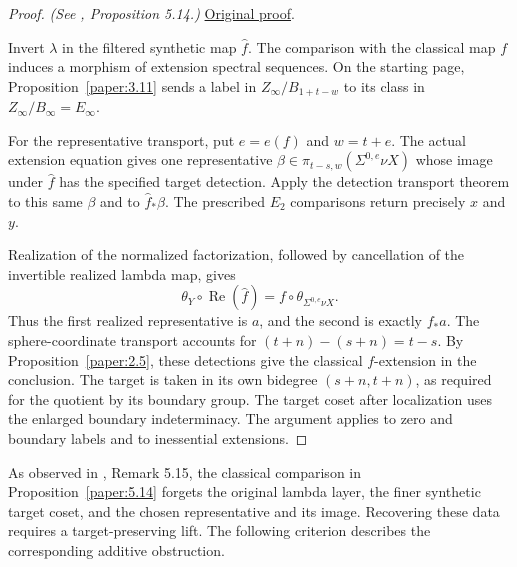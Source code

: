 \begin{proof}
\textit{(See \cite{LWX126}, Proposition 5.14.)} \href{paper/main.tex.html#L1589}{Original proof}.

Invert $\lambda$ in the filtered synthetic map $\widehat f$. The comparison with the classical map $f$ induces a morphism of extension spectral sequences. On the starting page, Proposition~\ref{paper:3.11} sends a label in $Z_\infty/B_{1+t-w}$ to its class in $Z_\infty/B_\infty=E_\infty$.

For the representative transport, put $e=e(f)$ and $w=t+e$.
The actual extension equation gives one representative
$\beta\in\pi_{t-s,w}(\Sigma^{0,e}\nu X)$ whose image under $\hat f$
has the specified target detection. Apply the detection transport theorem
to this same $\beta$ and to $\hat f_*\beta$. The prescribed $E_2$
comparisons return precisely $x$ and $y$.

Realization of the normalized factorization, followed by cancellation of
the invertible realized lambda map, gives
\[
\theta_Y\circ\operatorname{Re}(\hat f)
 =f\circ\theta_{\Sigma^{0,e}\nu X}.
\]
Thus the first realized representative is $a$, and the second is exactly
$f_*a$. The sphere-coordinate transport accounts for
$(t+n)-(s+n)=t-s$. By Proposition~\ref{paper:2.5}, these detections give
the classical $f$-extension in the conclusion. The target is taken in its
own bidegree $(s+n,t+n)$, as required for the quotient by its boundary
group. The target coset after localization uses the enlarged boundary
indeterminacy. The argument applies to zero and boundary labels and to
inessential extensions.
\end{proof}

As observed in \cite{LWX126}, Remark 5.15, the classical comparison
in Proposition~\ref{paper:5.14} forgets the original lambda layer,
the finer synthetic target coset, and the chosen representative and
its image. Recovering these data requires a target-preserving lift.
The following criterion describes the corresponding additive
obstruction.

